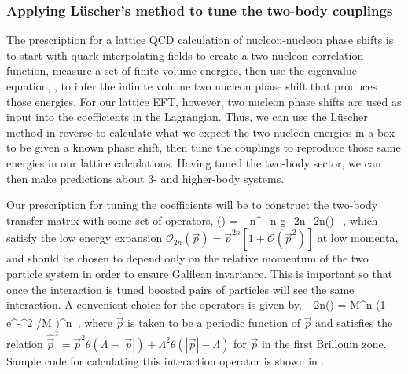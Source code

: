 \subsubsection{Applying L\"uscher's method to tune the two-body couplings}
The prescription for a lattice QCD calculation of nucleon-nucleon phase shifts is to start with quark interpolating fields to create a two nucleon correlation function, measure a set of finite volume energies, then use the eigenvalue equation, , to infer the infinite volume two nucleon phase shift that produces those energies. For our lattice EFT, however, two nucleon phase shifts are used as input into the coefficients in the Lagrangian. Thus, we can use the L\"uscher method in reverse to calculate what we expect the two nucleon energies in a box to be given a known phase shift, then tune the couplings to reproduce those same energies in our lattice calculations. Having tuned the two-body sector, we can then make predictions about 3- and higher-body systems.

Our prescription for tuning the coefficients will be to construct the two-body transfer matrix with some set of operators,
\beq
\label{eq:tuningcoef}
() = \sum_n^{\Lambda_n} g_{2n}{}_{2n}() \ ,
\eeq
which satisfy the low energy expansion ${\mathcal{ O}}_{2n}(\vec{p}) = \vec{p}^{2n} \left[ 1 + {\mathcal{ O}}(\vec{p}^2) \right]$ at low momenta, and should be chosen to depend only on the relative momentum of the two particle system in order to ensure Galilean invariance. This is important so that once the interaction is tuned boosted pairs of particles will see the same interaction. A convenient choice for the operators is given by,
\beq
\label{eq:Ofunc}
{}_{2n}() =  M^n \left(1-e^{-^2 /M} \right)^n\ ,
\eeq
where $\hat{\vec{p}}$ is taken to be a periodic function of $\vec{p}$ and satisfies the relation $\hat{\vec{p}}^2 = \vec{p}^2 \theta(\Lambda-|\vec{p}|) + \Lambda^2  \theta(|\vec{p}| - \Lambda)$ for $\vec{p}$ in the first Brillouin zone. Sample code for calculating this interaction operator is shown in .

